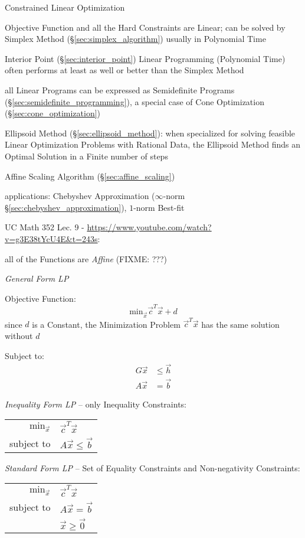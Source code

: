 Constrained Linear Optimization

Objective Function and all the Hard Constraints are Linear; can be solved by
Simplex Method (\S\ref{sec:simplex_algorithm}) usually in Polynomial Time

Interior Point (\S\ref{sec:interior_point}) Linear Programming
(Polynomial Time) often performs at least as well or better than the Simplex
Method

all Linear Programs can be expressed as Semidefinite Programs
(\S\ref{sec:semidefinite_programming}), a special case of Cone Optimization
(\S\ref{sec:cone_optimization})

Ellipsoid Method (\S\ref{sec:ellipsoid_method}): when specialized for solving
feasible Linear Optimization Problems with Rational Data, the Ellipsoid Method
finds an Optimal Solution in a Finite number of steps

Affine Scaling Algorithm (\S\ref{sec:affine_scaling})

applications: Chebyshev Approximation ($\infty$-norm
\S\ref{sec:chebyshev_approximation}), $1$-norm Best-fit


UC Math 352 Lec. 9 - \url{https://www.youtube.com/watch?v=g3E38tYcU4E&t=243s}:

all of the Functions are \emph{Affine} (FIXME: ???)

\emph{General Form LP}

Objective Function:
\[
  \mathrm{min}_{\vec{x}} \vec{c}^T\vec{x} + d
\]
since $d$ is a Constant, the Minimization Problem $\vec{c}^T\vec{x}$ has the
same solution without $d$

Subject to:
\begin{align*}
  G\vec{x} & \leq \vec{h} \\
  A\vec{x} & = \vec{b}
\end{align*}

\emph{Inequality Form LP} -- only Inequality Constraints:

\begin{tabular}{r l}
  $\mathrm{min}_{\vec{x}}$ & $\vec{c}^T\vec{x}$      \\
  subject to               & $A\vec{x} \leq \vec{b}$ \\
\end{tabular}

\emph{Standard Form LP} -- Set of Equality Constraints and Non-negativity
Constraints:

\begin{tabular}{r l}
  $\mathrm{min}_{\vec{x}}$ & $\vec{c}^T\vec{x}$     \\
  subject to               & $A\vec{x} = \vec{b}$   \\
                           & $\vec{x} \geq \vec{0}$ \\
\end{tabular}

